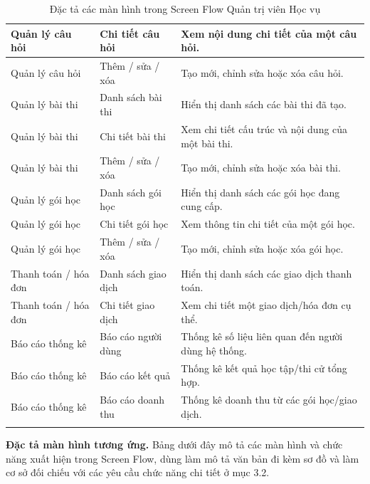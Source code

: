 \documentclass[12pt,a4paper,oneside]{report}
\begin{document}
\begin{longtable}{|p{3.0cm}|p{4.1cm}|p{7.0cm}|}
Quản lý câu hỏi & Chi tiết câu hỏi & Xem nội dung chi tiết của một câu hỏi. \\ \hline
Quản lý câu hỏi & Thêm / sửa / xóa & Tạo mới, chỉnh sửa hoặc xóa câu hỏi. \\ \hline
Quản lý bài thi & Danh sách bài thi & Hiển thị danh sách các bài thi đã tạo. \\ \hline
Quản lý bài thi & Chi tiết bài thi & Xem chi tiết cấu trúc và nội dung của một bài thi. \\ \hline
Quản lý bài thi & Thêm / sửa / xóa & Tạo mới, chỉnh sửa hoặc xóa bài thi. \\ \hline
Quản lý gói học & Danh sách gói học & Hiển thị danh sách các gói học đang cung cấp. \\ \hline
Quản lý gói học & Chi tiết gói học & Xem thông tin chi tiết của một gói học. \\ \hline
Quản lý gói học & Thêm / sửa / xóa & Tạo mới, chỉnh sửa hoặc xóa gói học. \\ \hline
Thanh toán / hóa đơn & Danh sách giao dịch & Hiển thị danh sách các giao dịch thanh toán. \\ \hline
Thanh toán / hóa đơn & Chi tiết giao dịch & Xem chi tiết một giao dịch/hóa đơn cụ thể. \\ \hline
Báo cáo thống kê & Báo cáo người dùng & Thống kê số liệu liên quan đến người dùng hệ thống. \\ \hline
Báo cáo thống kê & Báo cáo kết quả & Thống kê kết quả học tập/thi cử tổng hợp. \\ \hline
Báo cáo thống kê & Báo cáo doanh thu & Thống kê doanh thu từ các gói học/giao dịch. \\ \hline
\caption{Đặc tả các màn hình trong Screen Flow Quản trị viên Học vụ}
\end{longtable}
\clearpage

\noindent\textbf{Đặc tả màn hình tương ứng.} Bảng dưới đây mô tả các màn hình và chức năng xuất hiện trong Screen Flow, dùng làm mô tả văn bản đi kèm sơ đồ và làm cơ sở đối chiếu với các yêu cầu chức năng chi tiết ở mục 3.2.
\end{document}

